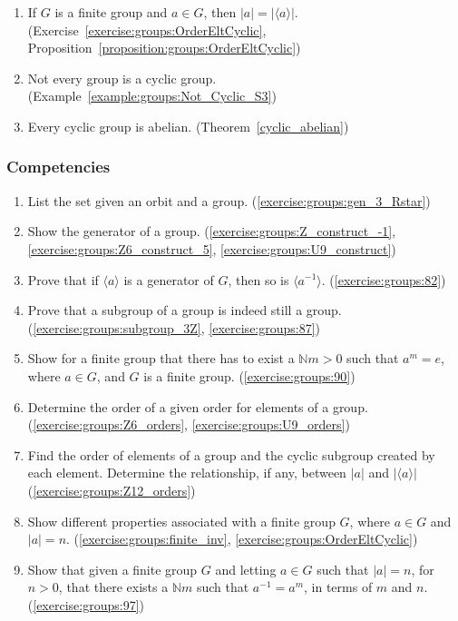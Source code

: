 \begin{enumerate}
\item
If $G$ is a finite group and $a \in G$, then $|a| = |\langle a \rangle|$. (Exercise~\ref{exercise:groups:OrderEltCyclic}, Proposition~\ref{proposition:groups:OrderEltCyclic})

\item
Not every group is a cyclic group. (Example~\ref{example:groups:Not_Cyclic_S3})

\item
Every cyclic group is abelian. (Theorem~\ref{cyclic_abelian})

\end{enumerate}

\subsubsection*{Competencies}
\begin{enumerate}
\item
List the set given an orbit and a group.  (\ref{exercise:groups:gen_3_Rstar})

\item
Show the generator of a group.  (\ref{exercise:groups:Z_construct_-1}, \ref{exercise:groups:Z6_construct_5}, \ref{exercise:groups:U9_construct})

\item
Prove that if $\langle a \rangle$ is a generator of $G$, then so is $\langle a^{-1} \rangle$. (\ref{exercise:groups:82})

\item
Prove that a subgroup of a group is indeed still a group.  (\ref{exercise:groups:subgroup_3Z}, \ref{exercise:groups:87})

\item
Show for a finite group that there has to exist a ${\mathbb N} m > 0$ such that $a^m = e$, where $a \in G$, and $G$ is a finite group. (\ref{exercise:groups:90})

\item
Determine the order of a given order for elements of a group. (\ref{exercise:groups:Z6_orders}, \ref{exercise:groups:U9_orders})

\item
Find the order of elements of a group and the cyclic subgroup created by each element.  Determine the relationship, if any, between $|a|$ and $|\langle a \rangle|$ (\ref{exercise:groups:Z12_orders})

\item
Show different properties associated with a finite group $G$, where $a \in G$ and $|a| = n$. (\ref{exercise:groups:finite_inv}, \ref{exercise:groups:OrderEltCyclic})

\item
Show that given a finite group $G$ and letting $a \in G$ such that $|a| = n$, for $n > 0$, that there exists a ${\mathbb N} m$ such that $a^{-1} = a^m$, in terms of $m$ and $n$. (\ref{exercise:groups:97})

\end{enumerate}


